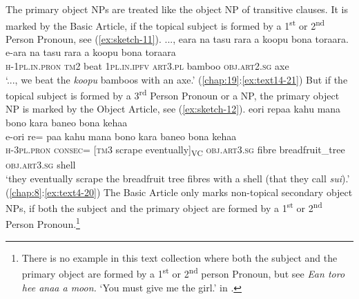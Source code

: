 \documentclass[output=paper]{langscibook}
\begin{document}
The primary object NPs are treated like the object NP of transitive clauses. It is marked by the Basic Article, if the topical subject is formed by a 1\textsuperscript{st} or 2\textsuperscript{nd} Person Pronoun, see (\ref{ex:sketch-11}).
\ea\label{ex:sketch-11}
    ..., eara na tasu rara a koopu bona toraara.\\
    \gll e-ara	na	tasu	rara	a	koopu	bona	toraara\\
    \textsc{h}-1\textsc{pl}.\textsc{in}.\textsc{pron}	\textsc{tm}2	beat	1\textsc{pl}.\textsc{in}.\textsc{ipfv}	\textsc{art}3.\textsc{pl}	bamboo	\textsc{obj}.\textsc{art}2.\textsc{sg}	axe\\
    \glt `..., we beat the \textit{koopu} bamboos with an axe.' (\ref{chap:19}:\ref{ex:text14-21})
\z
But if the topical subject is formed by a 3\textsuperscript{rd} Person Pronoun or a NP, the primary object NP is marked by the Object Article, see (\ref{ex:sketch-12}).
\ea\label{ex:sketch-12}
    eori repaa kahu mana bono kara baneo bona kehaa\\
    \gll e-ori	re=  paa	kahu	mana	bono	kara	baneo	bona	kehaa\\
    \textsc{h}-3\textsc{pl}.\textsc{pron}	\textsc{consec}= [\textsc{tm}3	scrape	eventually]\textsubscript{VC}	\textsc{obj}.\textsc{art}3.\textsc{sg}	fibre	breadfruit\_tree	\textsc{obj}.\textsc{art}3.\textsc{sg}	shell\\
    \glt `they eventually scrape the breadfruit tree fibres with a shell (that they call \textit{sui}).' (\ref{chap:8}:\ref{ex:text4-20})
\z
The Basic Article only marks non-topical secondary object NPs, if both the subject and the primary object are formed by a 1\textsuperscript{st} or 2\textsuperscript{nd}  Person Pronoun.\footnote{There is no example in this text collection where both the subject and the primary object are formed by a 1\textsuperscript{st} or 2\textsuperscript{nd} person Pronoun, but see \textit{Ean toro hee anaa a moon.} `You must give me the girl.' in \textcite[490]{Mosel:2010bh}.}
\end{document}
